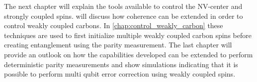 The next chapter will explain the tools available to control the NV-center and strongly coupled spins.
 will discuss how coherence can be extended
in order to control weakly coupled carbons.
In \cref{chap:control_weakly_carbon} these techniques are used to first initialize multiple weakly coupled carbon spins before creating entanglement using the parity measurement.
The last chapter will provide an outlook on how the capabilities developed can be extended to perform deterministic parity measurements and show simulations indicating that it is possible to perform multi qubit error correction using weakly coupled spins.
